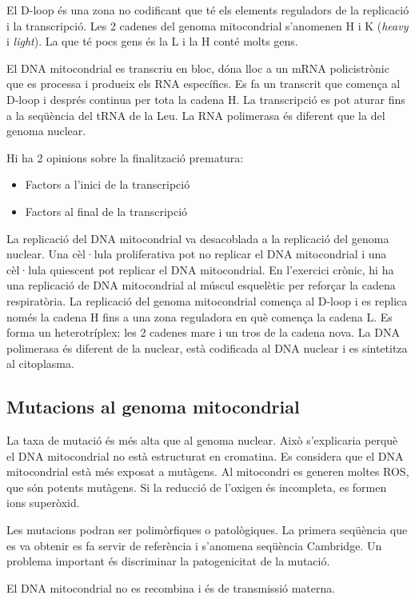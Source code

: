 El D-loop és una zona no codificant que té els elements reguladors de la replicació i la transcripció. Les 2 cadenes del genoma mitocondrial s'anomenen H i K (\textit{heavy} i \textit{light}). La que té pocs gens és la L i la H conté molts gens.

El DNA mitocondrial es transcriu en bloc, dóna lloc a un mRNA policistrònic que es processa i produeix els RNA específics. Es fa un transcrit que comença al D-loop i després continua per tota la cadena H. La transcripció es pot aturar fins a la seqüència del tRNA de la Leu. La RNA polimerasa és diferent que la del genoma nuclear.

Hi ha 2 opinions sobre la finalització prematura:
\begin{itemize}
\item Factors a l'inici de la transcripció
\item Factors al final de la transcripció
\end{itemize}

La replicació del DNA mitocondrial va desacoblada a la replicació del genoma nuclear. Una cèl·lula proliferativa pot no replicar el DNA mitocondrial i una cèl·lula quiescent pot replicar el DNA mitocondrial. En l'exercici crònic, hi ha una replicació de DNA mitocondrial al múscul esquelètic per reforçar la cadena respiratòria. La replicació del genoma mitocondrial comença al D-loop i es replica només la cadena H fins a una zona reguladora en què comença la cadena L. Es forma un heterotríplex: les 2 cadenes mare i un tros de la cadena nova. La DNA polimerasa és diferent de la nuclear, està codificada al DNA nuclear i es sintetitza al citoplasma.

\subsection{Mutacions al genoma mitocondrial}
\label{sec:mutacions-al-genoma}
La taxa de mutació és més alta que al genoma nuclear. Això s'explicaria perquè el DNA mitocondrial no està estructurat en cromatina. Es considera que el DNA mitocondrial està més exposat a mutàgens. Al mitocondri es generen moltes ROS, que són potents mutàgens. Si la reducció de l'oxigen és incompleta, es formen ions superòxid.

Les mutacions podran ser polimòrfiques o patològiques. La primera seqüència que es va obtenir es fa servir de referència i s'anomena seqüència Cambridge. Un problema important és discriminar la patogenicitat de la mutació.

El DNA mitocondrial no es recombina i és de transmissió materna.

